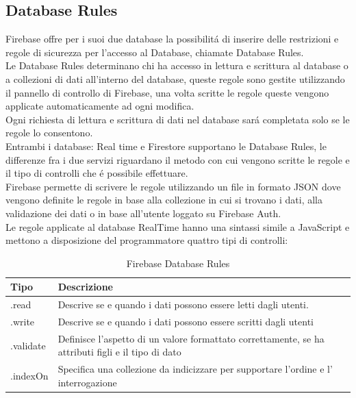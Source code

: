 \subsection{Database Rules}                 %
Firebase offre per i suoi due database la possibilit\'a di inserire delle restrizioni e regole di sicurezza per l'accesso al Database, chiamate Database Rules.\\
Le Database Rules determinano chi ha accesso in lettura e scrittura al database o a collezioni di dati all'interno del database, queste regole sono gestite utilizzando il pannello di controllo di Firebase, una volta scritte le regole queste vengono applicate automaticamente ad ogni modifica. \\
Ogni richiesta di lettura e scrittura di dati nel database sar\'a completata solo se le regole lo consentono.\\
Entrambi i database: Real time e Firestore supportano le Database Rules, le differenze fra i due servizi riguardano il metodo con cui vengono scritte le regole e il tipo di controlli che \'e possibile effettuare.\\
Firebase permette di scrivere le regole utilizzando un file in formato JSON dove vengono definite le regole in base alla collezione in cui si trovano i dati, alla validazione dei dati o in base all'utente loggato su Firebase Auth.\\
Le regole applicate al database RealTime hanno una sintassi simile a JavaScript e mettono a disposizione del programmatore quattro tipi di controlli:

\begin{table}[h]
\begin{center}
\begin{tabular}{|p{2cm}|p{12cm}|}
    \hline
    {\textbf{Tipo}} & {\textbf{Descrizione}} \\ \hline
    .read & Descrive se e quando i dati possono essere letti dagli utenti.\\ \hline
    .write & Descrive se e quando i dati possono essere scritti dagli utenti\\ \hline
     .validate & Definisce l'aspetto di un valore formattato correttamente, se ha attributi figli e il tipo di dato\\ \hline
    .indexOn & Specifica una collezione da indicizzare per supportare l'ordine e l' interrogazione\\ \hline
\end{tabular}
\caption[Firbase Rules ]{Firebase Database Rules}\label{tab:Firebase Database Rules}
\end{center}
\end{table}

